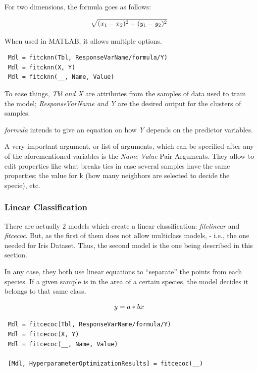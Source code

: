 \documentclass[11pt]{article}
\begin{document}
For two dimensions, the formula goes as follows:

\begin{equation}
 \centering
 \sqrt{(x_1 - x_2)^2 + (y_1 - y_2)^2}
\end{equation}

When used in MATLAB, it allows multiple options.

\begin{verbatim}
 Mdl = fitcknn(Tbl, ResponseVarName/formula/Y)
 Mdl = fitcknn(X, Y)
 Mdl = fitcknn(__, Name, Value)
\end{verbatim}

To ease things, \textit{Tbl and X} are attributes from the samples of data 
used to train the model; \textit{ResponseVarName and Y} are the desired output
for the clusters of samples.

\textit{formula} intends to give an equation on how \textit{Y} depends on the
predictor variables.

A very important argument, or list of arguments, which can be specified after
any of the aforementioned variables is the \textit{Name-Value} Pair Arguments.
They allow to edit properties like what breaks ties in case several samples have
the same properties; the value for k (how many neighbors are selected to decide
the specie), etc.

\subsubsection{Linear Classification}

There are actually 2 models which create a linear classification:
\textit{fitclinear} and \textit{fitcecoc}. But, as the first of them does not 
allow multiclass models, - i.e., the one needed for Iris Dataset. Thus, the 
second model is the one being described in this section.

In any case, they both use linear equations to ``separate'' the points from each
species. If a given sample is in the area of a certain species, the model 
decides it belongs to that same class.

\begin{equation}
 \centering
 y = a * bx
\end{equation}

\begin{verbatim}
 Mdl = fitcecoc(Tbl, ResponseVarName/formula/Y)
 Mdl = fitcecoc(X, Y)
 Mdl = fitcecoc(__, Name, Value)

 [Mdl, HyperparameterOptimizationResults] = fitcecoc(__)
\end{verbatim}
\end{document}
